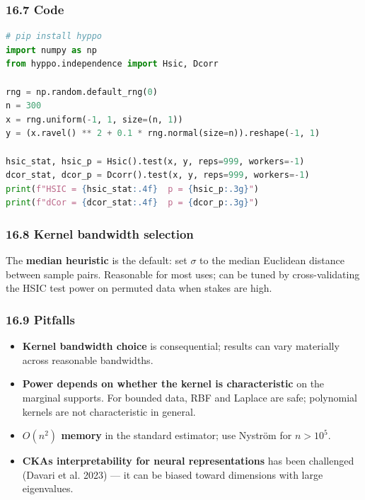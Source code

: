 \documentclass{article}
\providecommand{\tightlist}{\setlength{\itemsep}{0pt}\setlength{\parskip}{0pt}}
\begin{document}
\subsubsection{16.7 Code}\label{167-code}

\begin{lstlisting}[language=Python]
# pip install hyppo
import numpy as np
from hyppo.independence import Hsic, Dcorr

rng = np.random.default_rng(0)
n = 300
x = rng.uniform(-1, 1, size=(n, 1))
y = (x.ravel() ** 2 + 0.1 * rng.normal(size=n)).reshape(-1, 1)

hsic_stat, hsic_p = Hsic().test(x, y, reps=999, workers=-1)
dcor_stat, dcor_p = Dcorr().test(x, y, reps=999, workers=-1)
print(f"HSIC = {hsic_stat:.4f}  p = {hsic_p:.3g}")
print(f"dCor = {dcor_stat:.4f}  p = {dcor_p:.3g}")
\end{lstlisting}

\subsubsection{16.8 Kernel bandwidth
selection}\label{168-kernel-bandwidth-selection}

The \textbf{median heuristic} is the default: set \(\sigma\) to the
median Euclidean distance between sample pairs. Reasonable for most
uses; can be tuned by cross-validating the HSIC test power on permuted
data when stakes are high.

\subsubsection{16.9 Pitfalls}\label{169-pitfalls}

\begin{itemize}
\tightlist
\item
  \textbf{Kernel bandwidth choice} is consequential; results can vary
  materially across reasonable bandwidths.
\item
  \textbf{Power depends on whether the kernel is characteristic} on the
  marginal supports. For bounded data, RBF and Laplace are safe;
  polynomial kernels are not characteristic in general.
\item
  \textbf{\(O(n^2)\) memory} in the standard estimator; use Nyström for
  \(n > 10^5\).
\item
  \textbf{CKA\textquotesingle s interpretability for neural
  representations} has been challenged (Davari et al. 2023) --- it can
  be biased toward dimensions with large eigenvalues.
\end{itemize}
\end{document}
